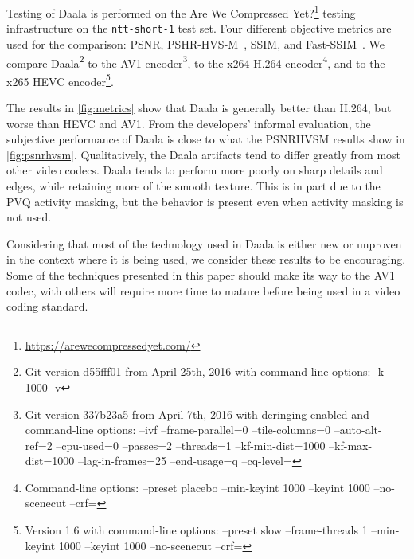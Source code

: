 \documentclass[english,conference,10pt]{IEEEtran}
\begin{document}
Testing of Daala is performed on the Are We Compressed 
Yet?\footnote{\url{https://arewecompressedyet.com/}} testing infrastructure
on the \texttt{ntt-short-1} test set.
Four different objective metrics are used for the comparison: PSNR,
PSHR-HVS-M~\cite{PSHRHVSM}, SSIM, and Fast-SSIM~\cite{FastSSIM}. We compare
Daala\footnote{Git version d55fff01 from April 25th, 2016 with command-line options: -k 1000 -v}
to the AV1 encoder\footnote{Git version 337b23a5 from April 7th, 2016 with deringing enabled and command-line options: --ivf --frame-parallel=0 --tile-columns=0 --auto-alt-ref=2 --cpu-used=0 --passes=2 --threads=1 --kf-min-dist=1000 --kf-max-dist=1000 --lag-in-frames=25 --end-usage=q --cq-level=}, to the x264 H.264
encoder\footnote{Command-line options: --preset placebo --min-keyint 1000 --keyint 1000 --no-scenecut --crf=},
and to the x265 HEVC encoder\footnote{Version 1.6 with command-line options: --preset slow --frame-threads 1 --min-keyint 1000 --keyint 1000 --no-scenecut --crf=}.

The results in \cref{fig:metrics} show that Daala is generally better than
H.264, but worse than HEVC and AV1. From the developers' informal
evaluation, the subjective performance of Daala is close to what the PSNR\-HVS\-M
results show in \cref{fig:psnrhvsm}. Qualitatively, the Daala artifacts tend to differ
greatly from most other video codecs. Daala tends to perform more poorly on sharp
details and edges, while retaining more of the smooth texture. This is in part due
to the PVQ activity masking, but the behavior is present even when activity masking
is not used.

Considering that most of the technology used in Daala is either new or unproven
in the context where it is being used, we consider these results to be encouraging.
Some of the techniques presented in this paper should make its way to the AV1 codec,
with others will require more time to mature before being used in a video coding
standard.



\end{document}

